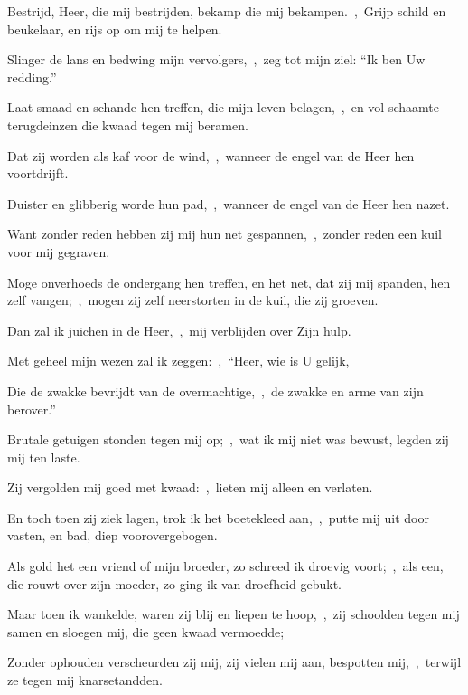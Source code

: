\documentclass[12pt,twoside,a5paper]{article}
\begin{document}
\begin{halfparskip}

   Bestrijd, Heer, die mij bestrijden, bekamp die mij bekampen.~\sep\ Grijp schild en beukelaar, en rijs op om mij te helpen.


  Slinger de lans en bedwing mijn vervolgers,~\sep\ zeg tot mijn ziel: ``Ik ben Uw redding.''

  Laat smaad en schande hen treffen, die mijn leven belagen,~\sep\ en vol schaamte terugdeinzen die kwaad tegen mij beramen.

  Dat zij worden als kaf voor de wind,~\sep\ wanneer de engel van de Heer hen voortdrijft.

  Duister en glibberig worde hun pad,~\sep\ wanneer de engel van de Heer hen nazet.

  Want zonder reden hebben zij mij hun net gespannen,~\sep\ zonder reden een kuil voor mij gegraven.

  Moge onverhoeds de ondergang hen treffen, en het net, dat zij mij spanden, hen zelf vangen;~\sep\ mogen zij zelf neerstorten in de kuil, die zij groeven.

  Dan zal ik juichen in de Heer,~\sep\ mij verblijden over Zijn hulp.

  Met geheel mijn wezen zal ik zeggen:~\sep\ ``Heer, wie is U gelijk,

  Die de zwakke bevrijdt van de overmachtige,~\sep\ de zwakke en arme van zijn berover.''

  Brutale getuigen stonden tegen mij op;~\sep\ wat ik mij niet was bewust, legden zij mij ten laste.

  Zij vergolden mij goed met kwaad:~\sep\ lieten mij alleen en verlaten.

  En toch toen zij ziek lagen, trok ik het boetekleed aan,~\sep\ putte mij uit door vasten, en bad, diep voorovergebogen.

  Als gold het een vriend of mijn broeder, zo schreed ik droevig voort;~\sep\ als een, die rouwt over zijn moeder, zo ging ik van droefheid gebukt.

  Maar toen ik wankelde, waren zij blij en liepen te hoop,~\sep\ zij schoolden tegen mij samen en sloegen mij, die geen kwaad vermoedde;

  Zonder ophouden verscheurden zij mij, zij vielen mij aan, bespotten mij,~\sep\ terwijl ze tegen mij knarsetandden.


\end{halfparskip}
\end{document}
